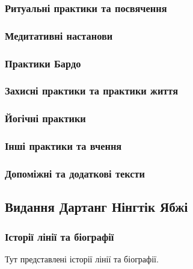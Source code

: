 \documentclass{article}
\begin{document}
\subsubsection{Ритуальні практики та посвячення}
\subsubsection{Медитативні настанови}
\subsubsection{Практики Бардо}
\subsubsection{Захисні практики та практики життя}
\subsubsection{Йогічні практики}
\subsubsection{Інші практики та вчення}
\subsubsection{Допоміжні та додаткові тексти}

\newpage
\subsection{Видання Дартанг Нінгтік Ябжі}

\subsubsection{Історії лінії та біографії}

Тут представлені історії лінії та біографії.
\end{document}
